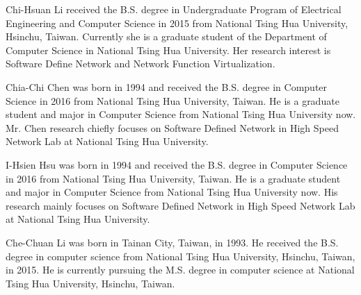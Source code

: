 \documentclass[journal]{IEEEtran}
\begin{document}
\begin{IEEEbiography}
{Chi-Hsuan Li} received the B.S. degree in Undergraduate Program of Electrical Engineering and Computer Science in 2015 from National Tsing Hua University, Hsinchu, Taiwan. Currently she is a graduate student of the Department of Computer Science in National Tsing Hua University. Her research interest is Software Define Network and Network Function Virtualization.
\end{IEEEbiography}

\begin{IEEEbiography}
{Chia-Chi Chen} was born in 1994 and  received the B.S. degree in Computer Science in 2016 from National Tsing Hua University, Taiwan.
He is a graduate student and major in Computer Science from National Tsing Hua University now.
Mr. Chen research chiefly focuses on Software Defined Network in High Speed Network Lab at National Tsing Hua University.
\end{IEEEbiography}

\begin{IEEEbiography}
{I-Hsien Hsu} was born in 1994 and  received the B.S. degree in Computer Science in 2016 from National Tsing Hua University, Taiwan.
He is a graduate student and major in Computer Science from National Tsing Hua University now. His research mainly focuses on Software Defined Network in High Speed Network Lab at National Tsing Hua University.
\end{IEEEbiography}

\begin{IEEEbiography}
{Che-Chuan Li} was born in Tainan City, Taiwan, in 1993. He received the B.S. degree in computer science from National Tsing Hua University, Hsinchu, Taiwan, in 2015. He is currently pursuing the M.S. degree in computer science at National Tsing Hua University, Hsinchu, Taiwan.
\end{IEEEbiography}
\end{document}
